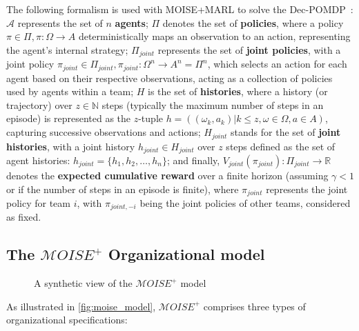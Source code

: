 \documentclass[sigconf,anonymous]{aamas}
\begin{document}
The following formalism is used with MOISE+MARL to solve the Dec-POMDP~\citep{Beynier2013,Albrecht2024}: $\mathcal{A}$ represents the set of $n$ \textbf{agents}; $\Pi$ denotes the set of \textbf{policies}, where a policy $\pi \in \Pi, \pi: \Omega \rightarrow A$ deterministically maps an observation to an action, representing the agent's internal strategy; $\Pi_{joint}$ represents the set of \textbf{joint policies}, with a joint policy $\pi_{joint} \in \Pi_{joint}, \pi_{joint}: \Omega^n \rightarrow A^n = \Pi^n$, which selects an action for each agent based on their respective observations, acting as a collection of policies used by agents within a team; $H$ is the set of \textbf{histories}, where a history (or trajectory) over $z \in \mathbb{N}$ steps (typically the maximum number of steps in an episode) is represented as the $z$-tuple $h = ((\omega_{k}, a_{k}) | k \leq z, \omega \in \Omega, a \in A)$, capturing successive observations and actions; $H_{joint}$ stands for the set of \textbf{joint histories}, with a joint history $h_{joint} \in H_{joint}$ over $z$ steps defined as the set of agent histories: $h_{joint} = \{h_1, h_2, \dots, h_n\}$; and finally, $V_{joint}(\pi_{joint}): \Pi_{joint} \rightarrow \mathbb{R}$ denotes the \textbf{expected cumulative reward} over a finite horizon (assuming $\gamma < 1$ or if the number of steps in an episode is finite), where $\pi_{joint}$ represents the joint policy for team $i$, with $\pi_{joint,-i}$ being the joint policies of other teams, considered as fixed.



\subsection{The $\mathcal{M}OISE^+$ Organizational model}

\begin{figure}[h!]
    
    \caption{A synthetic view of the $\mathcal{M}OISE^+$ model}
    \label{fig:moise_model}
\end{figure}

As illustrated in \autoref{fig:moise_model}, $\mathcal{M}OISE^+$ comprises three types of organizational specifications:
\end{document}
